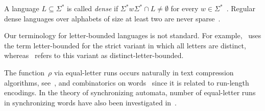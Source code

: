 A language $L \subseteq \Sigma^*$ is called \emph{dense}
if $\Sigma^* w \Sigma^* \cap L \ne \emptyset$
for every $w \in \Sigma^*$~\cite[Sect.~XII.4.1]{Pin2022}.
Regular dense languages over alphabets of size at least two
are never sparse~\cite[Cor.~4.28]{Pin2022}.

Our terminology for letter-bounded languages is not standard.
For example,~\cite{DBLP:journals/iandc/IbarraR16}
uses the term letter-bounded for the strict variant in which all letters are distinct,
whereas~\cite{DBLP:journals/tcs/CarpiDIM21}
refers to this variant as distinct-letter-bounded.

The function~$\rho$ via equal-letter runs occurs naturally in text compression
algorithms, see~\cite{DBLP:conf/dlt/FrosiniMRRS22,Prezza16},
and combinatorics on words~\cite{DBLP:journals/tcs/BiagiCLR25}
since it is related to run-length encodings. In the theory of synchronizing automata,
number of equal-letter runs in synchronizing words have also 
been investigated in~\cite{DBLP:journals/jalc/DonZ19}.